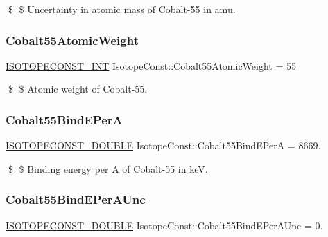 \$ \$ Uncertainty in atomic mass of Cobalt-\/55 in amu. \mbox{\label{group___isotope_const-_cobalt-_co55_ga79d96adf43bd9c67955580026d0fa4ec}} 
\subsubsection{\texorpdfstring{Cobalt55\+Atomic\+Weight}{Cobalt55AtomicWeight}}
{\footnotesize\ttfamily \mbox{\hyperlink{group___isotope_const-_macros_ga5f18360b3e99483a35c32d789e62621c}{I\+S\+O\+T\+O\+P\+E\+C\+O\+N\+S\+T\+\_\+\+I\+NT}} Isotope\+Const\+::\+Cobalt55\+Atomic\+Weight = 55}

\$ \$ Atomic weight of Cobalt-\/55. \mbox{\label{group___isotope_const-_cobalt-_co55_gab8e115148d63812e9b6c649a667d2aa3}} 
\subsubsection{\texorpdfstring{Cobalt55\+Bind\+E\+PerA}{Cobalt55BindEPerA}}
{\footnotesize\ttfamily \mbox{\hyperlink{group___isotope_const-_macros_ga8f45a7272ce02c0b4c65c44636ed719a}{I\+S\+O\+T\+O\+P\+E\+C\+O\+N\+S\+T\+\_\+\+D\+O\+U\+B\+LE}} Isotope\+Const\+::\+Cobalt55\+Bind\+E\+PerA = 8669.}

\$ \$ Binding energy per A of Cobalt-\/55 in keV. \mbox{\label{group___isotope_const-_cobalt-_co55_ga3dfa99ca33c1ceb08e86876e99ad3010}} 
\subsubsection{\texorpdfstring{Cobalt55\+Bind\+E\+Per\+A\+Unc}{Cobalt55BindEPerAUnc}}
{\footnotesize\ttfamily \mbox{\hyperlink{group___isotope_const-_macros_ga8f45a7272ce02c0b4c65c44636ed719a}{I\+S\+O\+T\+O\+P\+E\+C\+O\+N\+S\+T\+\_\+\+D\+O\+U\+B\+LE}} Isotope\+Const\+::\+Cobalt55\+Bind\+E\+Per\+A\+Unc = 0.}

